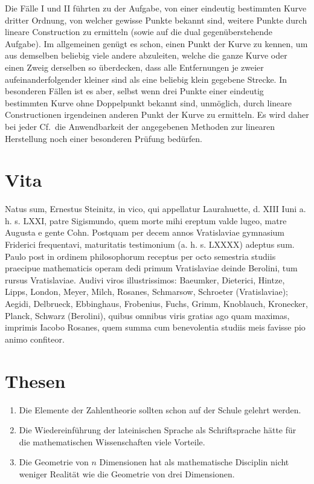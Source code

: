 \documentclass[11pt]{article}
\newcommand{\Cf}{\textup{Cf.}}
\begin{document}
Die Fälle I und II führten zu der Aufgabe, von einer eindeutig bestimmten Kurve dritter Ordnung, von welcher gewisse Punkte bekannt sind, weitere Punkte durch lineare Construction zu ermitteln (sowie auf die dual gegenüberstehende Aufgabe). Im allgemeinen genügt es schon, einen Punkt der Kurve zu kennen, um aus demselben beliebig viele andere abzuleiten, welche die ganze Kurve oder einen Zweig derselben so überdecken, dass alle Entfernungen je zweier aufeinanderfolgender kleiner sind als eine beliebig klein gegebene Strecke. In besonderen Fällen ist es aber, selbst wenn drei Punkte einer eindeutig bestimmten Kurve ohne Doppelpunkt bekannt sind, unmöglich, durch lineare Constructionen irgendeinen anderen Punkt der Kurve zu ermitteln. Es wird daher bei jeder \Cf\ die Anwendbarkeit der angegebenen Methoden zur linearen Herstellung noch einer besonderen Prüfung bedürfen.

\section*{Vita}
Natus sum, Ernestus Steinitz, in vico, qui appellatur Laurahuette, d. XIII Iuni a. h. s. LXXI, patre Sigismundo, quem morte mihi ereptum valde lugeo, matre Augusta e gente Cohn. Postquam per decem annos Vratislaviae gymnasium Friderici frequentavi, maturitatis testimonium (a. h. s. LXXXX) adeptus sum. Paulo post in ordinem philosophorum receptus per octo semestria studiis praecipue mathematicis operam dedi primum Vratislaviae deinde Berolini, tum rursus Vratislaviae. Audivi viros illustrissimos: Baeumker, Dieterici, Hintze, Lipps, London, Meyer, Milch, Rosanes, Schmarsow, Schroeter (Vratislaviae); Aegidi, Delbrueck, Ebbinghaus, Frobenius, Fuchs, Grimm, Knoblauch, Kronecker, Planck, Schwarz (Berolini), quibus omnibus viris gratias ago quam maximas, imprimis Iacobo Rosanes, quem summa cum benevolentia studiis meis favisse pio animo confiteor.

\section*{Thesen}
\begin{enumerate}
\item Die Elemente der Zahlentheorie sollten schon auf der Schule gelehrt werden.
\item Die Wiedereinführung der lateinischen Sprache als Schriftsprache hätte für die mathematischen Wissenschaften viele Vorteile.
\item Die Geometrie von $n$ Dimensionen hat als mathematische Disciplin nicht weniger Realität wie die Geometrie von drei Dimensionen.
\end{enumerate}
\end{document}

